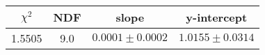\begin{tabular}{|c|c|c|c|}

\hline
$\chi^{2}$ & NDF & slope & y-intercept  \\
\hline
1.5505 & 9.0 & $0.0001\pm0.0002$ & $1.0155\pm0.0314$ \\
\hline

\end{tabular}